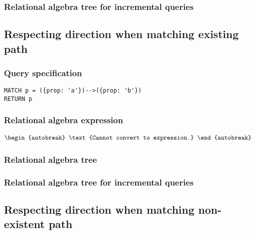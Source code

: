 \subsubsection*{Relational algebra tree for incremental queries}


\subsection{Respecting direction when matching existing path}

\subsubsection*{Query specification}

\begin{lstlisting}
MATCH p = ({prop: 'a'})-->({prop: 'b'})
RETURN p
\end{lstlisting}

\subsubsection*{Relational algebra expression}

\begin{align*}
\begin{autobreak}
\text{Cannot convert to expression.}
\end{autobreak}
\end{align*}

\subsubsection*{Relational algebra tree}


\subsubsection*{Relational algebra tree for incremental queries}


\subsection{Respecting direction when matching non-existent path}

